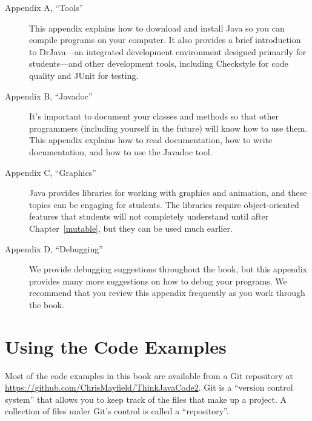 \begin{description}

\item[Appendix A, ``Tools''] \hfill

This appendix explains how to download and install Java so you can compile programs on your computer.
It also provides a brief introduction to DrJava---an integrated development environment designed primarily for students---and other development tools, including Checkstyle for code quality and JUnit for testing.

\item[Appendix B, ``Javadoc''] \hfill

It's important to document your classes and methods so that other programmers (including yourself in the future) will know how to use them.
This appendix explains how to read documentation, how to write documentation, and how to use the Javadoc tool.

\item[Appendix C, ``Graphics''] \hfill

Java provides libraries for working with graphics and animation, and these topics can be engaging for students.
The libraries require object-oriented features that students will not completely understand until after Chapter~\ref{mutable}, but they can be used much earlier.

\item[Appendix D, ``Debugging''] \hfill

We provide debugging suggestions throughout the book, but this appendix provides many more suggestions on how to debug your programs.
We recommend that you review this appendix frequently as you work through the book.

%

\end{description}


\section*{Using the Code Examples}
\label{code}

Most of the code examples in this book are available from a Git repository at \url{https://github.com/ChrisMayfield/ThinkJavaCode2}.
Git is a ``version control system'' that allows you to keep track of the files that make up a project.
A collection of files under Git's control is called a ``repository''.

